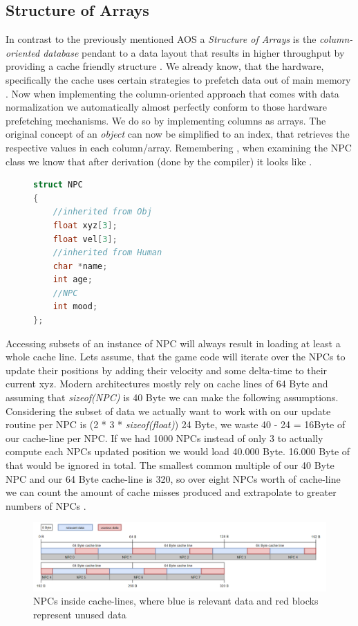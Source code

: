 \subsection{Structure of Arrays}
In contrast to the previously mentioned AOS  a \textit{Structure of Arrays} is the \textit{column-oriented database} pendant to a data layout that results in higher throughput by providing a cache friendly structure . We already know, that the hardware, specifically the cache uses certain strategies to prefetch data out of main memory . Now when implementing the column-oriented approach that comes with data normalization we automatically almost perfectly conform to those hardware prefetching mechanisms. We do so by implementing columns as arrays. The original concept of an \textit{object} can now be simplified to an index, that retrieves the respective values in each column/array.
Remembering , when examining the NPC class we know that after derivation (done by the compiler) it looks like .
\begin{figure}
\begin{lstlisting}[language=C++,name={NPC pod after derivation is done},label={post_deriv_npc}]
struct NPC 
{
	//inherited from Obj 
	float xyz[3];
	float vel[3];
	//inherited from Human
	char *name;
	int age;
	//NPC
	int mood;
};
\end{lstlisting}
\end{figure}
Accessing subsets of an instance of NPC will always result in loading at least a whole cache line. Lets assume, that the game code will iterate over the NPCs to update their positions by adding their velocity and some delta-time to their current xyz. Modern architectures mostly rely on cache lines of 64 Byte and assuming that \textit{sizeof(NPC)} is 40 Byte we can make the following assumptions. Considering the subset of data we actually want to work with on our update routine per NPC is (2 * 3 * \textit{sizeof(float)}) 24 Byte, we waste 40 - 24 = 16Byte of our cache-line per NPC. 
If we had 1000 NPCs instead of only 3 to actually compute each NPCs updated position we would load 40.000 Byte. 16.000 Byte of that would be ignored in total. The smallest common multiple of our 40 Byte NPC and our 64 Byte cache-line is 320, so over eight NPCs worth of cache-line we can count the amount of cache misses produced and extrapolate to greater numbers of NPCs .
\begin{figure}[!htbp]
	\centering
	\includegraphics[width=1.0\linewidth, height=0.3\linewidth]{PICs/CacheUtilizationNPC}
	\caption{NPCs inside cache-lines, where blue is relevant data and red blocks represent unused data}\label{cache_utilization_npc}
\end{figure}
